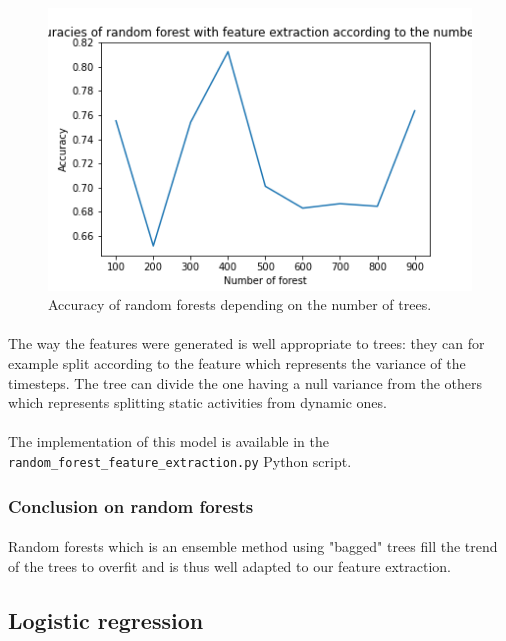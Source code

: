 \documentclass[a4paper, 11pt, oneside]{article}
\begin{document}
\begin{figure}[H]
\centering
\includegraphics[scale=0.4]{rf/random_forest_feature_extraction.png}
\caption{Accuracy of random forests depending on the number of trees.}
\label{fig:rf-feature-extraction}
\end{figure}

\paragraph{}The way the features were generated is well appropriate to trees: they can for example split according to the feature which represents the variance of the timesteps. The tree can divide the one having a null variance from the others which represents splitting static activities from dynamic ones.

\paragraph{}The implementation of this model is available in the \texttt{random\_forest\_feature\_extraction.py} Python script.

\subsubsection{Conclusion on random forests}
\paragraph{}Random forests which is an ensemble method using "bagged" trees fill the trend of the trees to overfit and is thus well adapted to our feature extraction. 

\subsection{Logistic regression} \label{subsec:lr}
\end{document}
